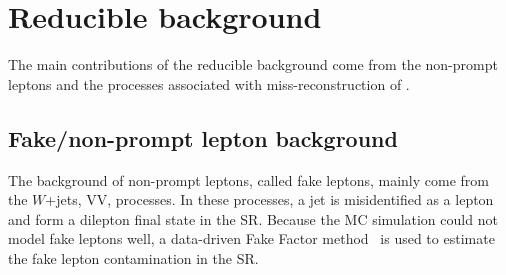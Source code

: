 
\section{Reducible background}
\label{sec:bkg_reducible_background}
The main contributions of the reducible background come from the non-prompt leptons and the processes associated with miss-reconstruction of \met.%


\subsection{Fake/non-prompt lepton background}
\label{subsec:bkg_fake_lepton_background}
The background of non-prompt leptons, called fake leptons, mainly come from the $W$+jets, VV, \ttbar processes.
In these processes, a jet is misidentified as a lepton and form a dilepton final state in the SR.
Because the MC simulation could not model fake leptons well, a data-driven Fake Factor method~\cite{ATLAS:2014aga} is used to estimate the fake lepton contamination in the SR. 



